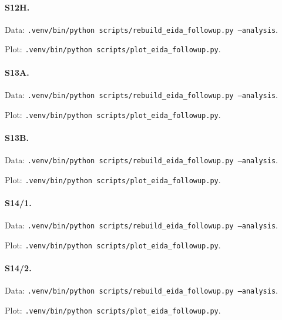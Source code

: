 \paragraph{S12H.}
\par Data: \texttt{.venv/bin/python scripts/rebuild\_eida\_followup.py --analysis}.
\par Plot: \texttt{.venv/bin/python scripts/plot\_eida\_followup.py}.
\par{}
\par{}
\par{}
\paragraph{S13A.}
\par Data: \texttt{.venv/bin/python scripts/rebuild\_eida\_followup.py --analysis}.
\par Plot: \texttt{.venv/bin/python scripts/plot\_eida\_followup.py}.
\par{}
\paragraph{S13B.}
\par Data: \texttt{.venv/bin/python scripts/rebuild\_eida\_followup.py --analysis}.
\par Plot: \texttt{.venv/bin/python scripts/plot\_eida\_followup.py}.
\par{}
\paragraph{S14/1.}
\par Data: \texttt{.venv/bin/python scripts/rebuild\_eida\_followup.py --analysis}.
\par Plot: \texttt{.venv/bin/python scripts/plot\_eida\_followup.py}.
\par{}
\par{}
\paragraph{S14/2.}
\par Data: \texttt{.venv/bin/python scripts/rebuild\_eida\_followup.py --analysis}.
\par Plot: \texttt{.venv/bin/python scripts/plot\_eida\_followup.py}.
\par{}
\par{}
